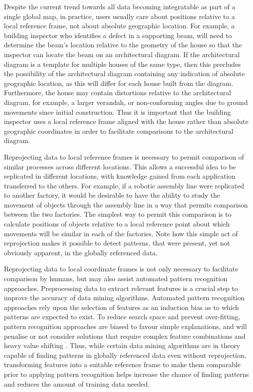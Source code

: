Despite the current trend towards all data becoming integratable as
part of a single global map, in practice, users usually care about
positions relative to a local reference frame, not about absolute
geographic location. For example, a building inspector who identifies a
defect in a supporting beam, will need to determine the beam's location
relative to the geometry of the house so that the inspector can locate
the beam on an architectural diagram. If the architectural diagram is a
template for multiple houses of the same type, then this precludes the
possibility of the architectural diagram containing any indication of
absolute geographic location, as this will differ for each house built
from the diagram. Furthermore, the house may contain distortions
relative to the architectural diagram, for example, a larger verandah,
or non-conforming angles due to ground movements since initial
construction. Thus it is important that the building inspector uses a local reference frame aligned with the house rather than absolute geographic coordinates in order to facilitate comparisons to the architectural diagram.

Reprojecting data to local reference frames is necessary to permit
comparison of similar processes across different locations. This allows
a successful idea to be replicated in different locations, with
knowledge gained from each application transferred to the others. For
example, if a robotic assembly line were replicated to another factory,
it would be desirable to have the ability to study the movement of objects through the assembly line
in a way that permits comparison between the two factories. The simplest
way to permit this comparison is to calculate positions of objects
relative to a local reference point about which movements will be
similar in each of the factories. Note how this simple act of
reprojection makes it possible to detect patterns, that were present,
yet not obviously apparent, in the globally referenced data.

Reprojecting data to local coordinate frames is not only necessary to facilitate comparison by humans, but may also assist automated pattern recognition approaches. Preprocessing data to extract relevant features is a crucial step to improve the accuracy of data mining algorithms. Automated pattern recognition approaches rely upon the selection of features as an induction bias as to which patterns are expected to exist. To reduce search space \cite{wolpert_no_1997} and prevent over-fitting, pattern recognition approaches are biased \cite{wolpert_lack_1996} to favour simple explanations, and will penalise or not consider solutions that require complex feature combinations and heavy value shifting \cite{Domingos2012}. Thus, while certain data mining algorithms are in theory capable of finding patterns in globally referenced data even without reprojection, transforming features into a suitable reference frame to make them comparable prior to applying %
pattern recognition helps increase the chance of finding patterns and reduces the amount of training data needed.

